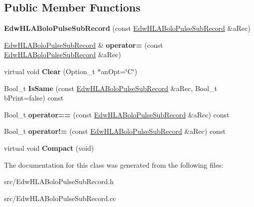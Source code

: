 \subsection*{Public Member Functions}
\begin{DoxyCompactItemize}
\item 
\hypertarget{class_edw_h_l_a_bolo_pulse_sub_record_a3429600af51738569622d7511db895c4}{
{\bfseries EdwHLABoloPulseSubRecord} (const \hyperlink{class_edw_h_l_a_bolo_pulse_sub_record}{EdwHLABoloPulseSubRecord} \&aRec)}
\label{class_edw_h_l_a_bolo_pulse_sub_record_a3429600af51738569622d7511db895c4}

\item 
\hypertarget{class_edw_h_l_a_bolo_pulse_sub_record_ad9300481dbee9c4e186153f41d1952f1}{
\hyperlink{class_edw_h_l_a_bolo_pulse_sub_record}{EdwHLABoloPulseSubRecord} \& {\bfseries operator=} (const \hyperlink{class_edw_h_l_a_bolo_pulse_sub_record}{EdwHLABoloPulseSubRecord} \&aRec)}
\label{class_edw_h_l_a_bolo_pulse_sub_record_ad9300481dbee9c4e186153f41d1952f1}

\item 
\hypertarget{class_edw_h_l_a_bolo_pulse_sub_record_a8f297a501d6a8b1f105c03646ded645c}{
virtual void {\bfseries Clear} (Option\_\-t $\ast$anOpt=\char`\"{}C\char`\"{})}
\label{class_edw_h_l_a_bolo_pulse_sub_record_a8f297a501d6a8b1f105c03646ded645c}

\item 
\hypertarget{class_edw_h_l_a_bolo_pulse_sub_record_a1a44161dc2c042ec68e510d21abda24c}{
Bool\_\-t {\bfseries IsSame} (const \hyperlink{class_edw_h_l_a_bolo_pulse_sub_record}{EdwHLABoloPulseSubRecord} \&aRec, Bool\_\-t bPrint=false) const }
\label{class_edw_h_l_a_bolo_pulse_sub_record_a1a44161dc2c042ec68e510d21abda24c}

\item 
\hypertarget{class_edw_h_l_a_bolo_pulse_sub_record_a74698fb526a15ac69dfb3ffd6d239dc4}{
Bool\_\-t {\bfseries operator==} (const \hyperlink{class_edw_h_l_a_bolo_pulse_sub_record}{EdwHLABoloPulseSubRecord} \&aRec) const }
\label{class_edw_h_l_a_bolo_pulse_sub_record_a74698fb526a15ac69dfb3ffd6d239dc4}

\item 
\hypertarget{class_edw_h_l_a_bolo_pulse_sub_record_ab85c07f9c74d035d2431f135bbd18a7c}{
Bool\_\-t {\bfseries operator!=} (const \hyperlink{class_edw_h_l_a_bolo_pulse_sub_record}{EdwHLABoloPulseSubRecord} \&aRec) const }
\label{class_edw_h_l_a_bolo_pulse_sub_record_ab85c07f9c74d035d2431f135bbd18a7c}

\item 
\hypertarget{class_edw_h_l_a_bolo_pulse_sub_record_a3dfa7c13f69455c022b1d29a95af0269}{
virtual void {\bfseries Compact} (void)}
\label{class_edw_h_l_a_bolo_pulse_sub_record_a3dfa7c13f69455c022b1d29a95af0269}

\end{DoxyCompactItemize}


The documentation for this class was generated from the following files:\begin{DoxyCompactItemize}
\item 
src/EdwHLABoloPulseSubRecord.h\item 
src/EdwHLABoloPulseSubRecord.cc\end{DoxyCompactItemize}
